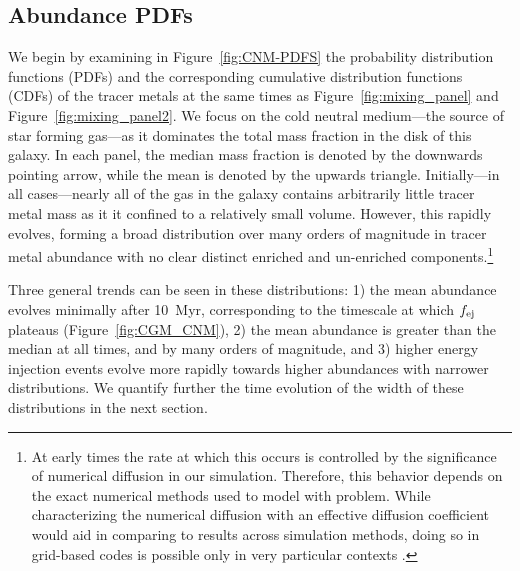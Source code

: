 \documentclass[twocolumn]{aastex62}
\begin{document}

\subsection{Abundance PDFs}
\label{sec:PDF}
We begin by examining in Figure~\ref{fig:CNM-PDFS} the probability distribution functions (PDFs) and the corresponding cumulative distribution functions (CDFs) of the tracer metals at the same times as Figure~\ref{fig:mixing_panel} and Figure~\ref{fig:mixing_panel2}. We focus on the cold neutral medium---the source of star forming gas---as it dominates the total mass fraction in the disk of this galaxy. In each panel, the median mass fraction is denoted by the downwards pointing arrow, while the mean is denoted by the upwards triangle. Initially---in all cases---nearly all of the gas in the galaxy contains arbitrarily little tracer metal mass as it it confined to a relatively small volume. However, this rapidly evolves, forming a broad distribution over many orders of magnitude in tracer metal abundance with no clear distinct enriched and un-enriched components.\footnote{At early times the rate at which this occurs is controlled by the significance of numerical diffusion in our simulation. Therefore, this behavior depends on the exact numerical methods used to model with problem. While characterizing the numerical diffusion with an effective diffusion coefficient would aid in comparing to results across simulation methods, doing so in grid-based codes is possible only in very particular contexts \citep[see][]{deAvillez2002}.
}

Three general trends can be seen in these distributions: 1) the mean abundance evolves minimally after 10~Myr, corresponding to the timescale at which $f_{\rm ej}$ plateaus (Figure~\ref{fig:CGM_CNM}), 2) the mean abundance is greater than the median at all times, and by many orders of magnitude, and 3) higher energy injection events evolve more rapidly towards higher abundances with narrower distributions. We quantify further the time evolution of the width of these distributions in the next section.
\end{document}
